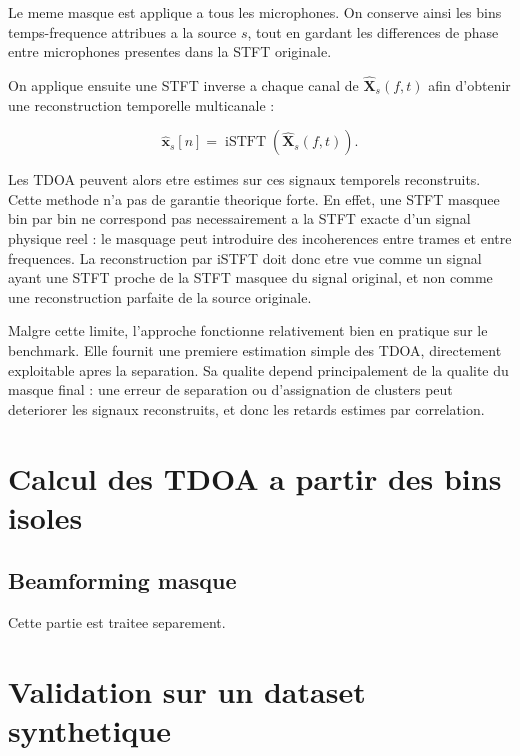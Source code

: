 \documentclass[11pt,a4paper]{article}
\begin{document}
          Le meme masque est applique a tous les microphones. On conserve ainsi les bins
          temps-frequence attribues a la source $s$, tout en gardant les differences de
          phase entre microphones presentes dans la STFT originale.
          
          On applique ensuite une STFT inverse a chaque canal de
          $\hat{\mathbf{X}}_s(f,t)$ afin d'obtenir une reconstruction temporelle
          multicanale :
          
          \[
            \hat{\mathbf{x}}_s[n]
            =
            \operatorname{iSTFT}
            \left(
              \hat{\mathbf{X}}_s(f,t)
              \right).
            \]
              
          Les TDOA peuvent alors etre estimes sur ces signaux temporels
          reconstruits. Cette methode n'a pas de garantie theorique forte. En
          effet, une STFT masquee bin par bin ne correspond pas necessairement a
          la STFT exacte d'un signal physique reel : le masquage peut introduire
          des incoherences entre trames et entre frequences. La reconstruction
          par iSTFT doit donc etre vue comme un signal ayant une STFT proche de
          la STFT masquee du signal original, et non comme une reconstruction
          parfaite de la source originale.
              
          Malgre cette limite, l'approche fonctionne relativement bien en
          pratique sur le benchmark. Elle fournit une premiere estimation simple
          des TDOA, directement exploitable apres la separation. Sa qualite
          depend principalement de la qualite du masque final : une erreur de
          separation ou d'assignation de clusters peut deteriorer les signaux
          reconstruits, et donc les retards estimes par correlation.


\section{Calcul des TDOA a partir des bins isoles}

\subsection{Beamforming masque}
Cette partie est traitee separement.
\section{Validation sur un dataset synthetique}
\end{document}
